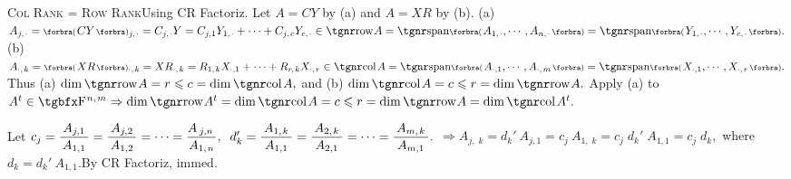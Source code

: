 \SepLine

\BulletPointX\textsc{Col Rank = Row Rank}\quad Using CR Factoriz. Let $A=CY$ by (a) and $A=XR$ by (b).\TextB{}
(a) $A_{j,\;\!\cdot}=\BigPar{CY}{_{j,\;\!\cdot}}=C_{j,\;\!\cdot}Y=C_{j,1}Y_{1,\;\!\cdot}+\dots+C_{j,\;\!c}Y_{c,\;\!\cdot}\in\row A=\Span[\BigPar]{A_{1,\;\!\cdot},\cdots,A_{n,\;\!\cdot}}=\Span[\BigPar]{Y_{1,\;\!\cdot},\cdots,Y_{c,\;\!\cdot}}.$\TextB{}
(b) $A_{\cdot,\;\!k}=\BigPar{XR}{_{\cdot,\;\!k}}=XR_{\cdot,\;\!k}=R_{1,\;\!k}X_{\cdot,1}+\dots+R_{r\:\!\!,\;\!k}X_{\cdot,\;\!r}\in\col A=\Span[\BigPar]{A_{\cdot,1},\cdots,A_{\cdot,\;\!m}}=\Span[\BigPar]{X_{\cdot,1},\cdots,X_{\cdot,\;\!r}}.$\TextB{}
Thus (a) $\dim\row A=r\leqslant c=\dim\col A,$ and (b) $\dim\col A=c\leqslant r=\dim\row A.$\vspace{2pt}\PfEnd\TextB{}
\Or Apply (a) to $A^t\in\FbbP{n,\;\!m}\Rightarrow\dim\row A^t=\dim\col A=c\leqslant r=\dim\row A=\dim\col A^t.$\PfEnd
\SepLine

Let $c_j={\displaystyle{\frac{\:A_{j,1}\:}{A_{1,1}}}}={\displaystyle{\frac{\:A_{j,2}\:}{A_{1,2}}}}=\dots={\displaystyle{\frac{A_{\:j,n\:}}{A_{1,\;\!n}}}},\;\;d_k'={\displaystyle{\frac{\:A_{1,\;\!k}\:}{A_{1,1}}}}={\displaystyle{\frac{\:A_{2,\;\!k}\:}{A_{2,1}}}}=\dots={\displaystyle{\frac{\:A_{m,\;\!k}\:}{A_{m,1}}}}.$\vspace{4pt}\parSol{}
{$\Rightarrow A_{j,\;\!k}=d_k'\:\!A_{j,1}=c_j\:\!A_{1,\;\!k}=c_j\;\!d_k'\;\!A_{1,1}=c_j\;\!d_k,$ where $d_k=d_k'\:\!A_{1,1}.$}\quad\Or By CR Factoriz, immed.\PfEnd
\SepLine

